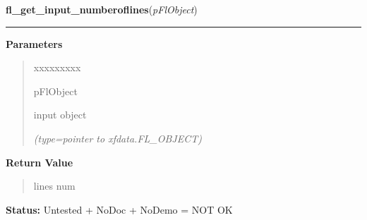 \hspace{.8\funcindent}\begin{boxedminipage}{\funcwidth}

    \raggedright \textbf{fl\_get\_input\_numberoflines}(\textit{pFlObject})

    \vspace{-1.5ex}

    \rule{\textwidth}{0.5\fboxrule}
\setlength{\parskip}{2ex}
\setlength{\parskip}{1ex}
      \textbf{Parameters}
      \vspace{-1ex}

      \begin{quote}
        \begin{Ventry}{xxxxxxxxx}

          \item[pFlObject]

          input object

            {\it (type=pointer to xfdata.FL\_OBJECT)}

        \end{Ventry}

      \end{quote}

      \textbf{Return Value}
    \vspace{-1ex}

      \begin{quote}
      lines num

      \end{quote}

\textbf{Status:} Untested + NoDoc + NoDemo = NOT OK



    \end{boxedminipage}

    \label{xformslib:flinput:fl_get_input_format}

    \vspace{0.5ex}

